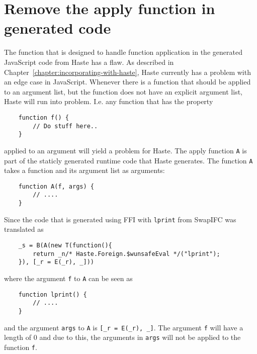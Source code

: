 \section{Remove the apply function in generated code}
The function that is designed to handle function application in the generated JavaScript code from Haste has a flaw. As described in Chapter~\ref{chapter:incorporating-with-haste}, Haste currently has a problem with an edge case in JavaScript. Whenever there is a function that should be applied to an argument list, but the function does not have an explicit argument list, Haste will run into problem. I.e. any function that has the property
\begin{verbatim}
    function f() {
        // Do stuff here..
    }
\end{verbatim}
applied to an argument will yield a problem for Haste. The apply function {\tt A} is part of the staticly generated runtime code that Haste generates. The function {\tt A} takes a function and its argument list as arguments:
\begin{verbatim}
    function A(f, args) {
        // ....
    }
\end{verbatim}
Since the code that is generated using FFI with {\tt lprint} from SwapIFC  was translated as
\begin{verbatim}
    _s = B(A(new T(function(){
        return _n/* Haste.Foreign.$wunsafeEval */("lprint");
    }), [_r = E(_r), _]))
\end{verbatim}
where the argument {\tt f} to {\tt A} can be seen as
\begin{verbatim}
    function lprint() {
        // ....
    }
\end{verbatim}
and the argument {\tt args} to {\tt A} is {\tt [\_r = E(\_r), \_]}. The argument {\tt f} will have a length of 0 and due to this, the arguments in {\tt args} will not be applied to the function {\tt f}.

